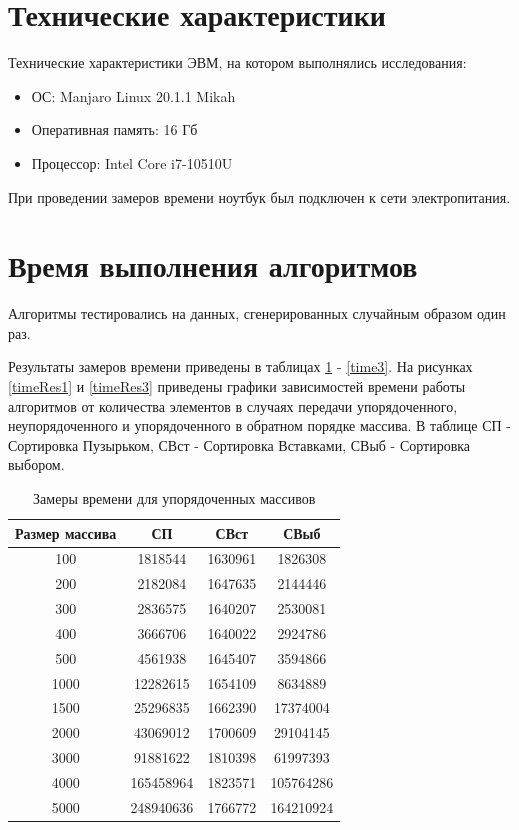 \documentclass[12pt]{report}
\begin{document}
\newpage

\section{Технические характеристики}
Технические характеристики ЭВМ, на котором выполнялись исследования:
\begin{itemize}
\item ОС: Manjaro Linux 20.1.1 Mikah
\item Оперативная память: 16 Гб
\item Процессор: Intel Core i7-10510U
\end{itemize}


При проведении замеров времени ноутбук был подключен к сети электропитания.

\section{Время выполнения алгоритмов}
Алгоритмы тестировались на данных, сгенерированных случайным образом один раз.

Результаты замеров времени приведены в таблицах \ref{time1} - \ref{time3}. На рисунках \ref{timeRes1} и \ref{timeRes3} приведены графики зависимостей времени работы алгоритмов от количества элементов в случаях передачи упорядоченного, неупорядоченного и упорядоченного в обратном порядке массива. В таблице СП - Сортировка Пузырьком, СВст - Сортировка Вставками, СВыб - Сортировка выбором.

\newpage
\begin{table}[h]
	\begin{center}
		\caption{\label{time1} Замеры времени для упорядоченных массивов}
		\begin{tabular}{|c c c c|} 
 			\hline
			Размер массива & СП & СВст & СВыб \\ [0.5ex] 
 			\hline\hline
 			100 & 1818544 & 1630961 & 1826308\\
 			\hline
 			200 & 2182084 & 1647635 & 2144446 \\
 			\hline
			300 & 2836575 & 1640207 & 2530081\\
			\hline
			400 & 3666706 & 1640022 & 2924786\\
			\hline
			500 & 4561938 & 1645407 & 3594866\\
			\hline
			1000 & 12282615 & 1654109 & 8634889\\
			\hline
			1500 & 25296835 & 1662390 & 17374004\\
			\hline
			2000 & 43069012 & 1700609 & 29104145\\
			\hline
			3000 & 91881622 & 1810398 & 61997393\\
			\hline
			4000 & 165458964 & 1823571 & 105764286\\
			\hline
			5000 & 248940636 & 1766772 & 164210924\\
			\hline
			\end{tabular}
	\end{center}
\end{table}
\end{document}
